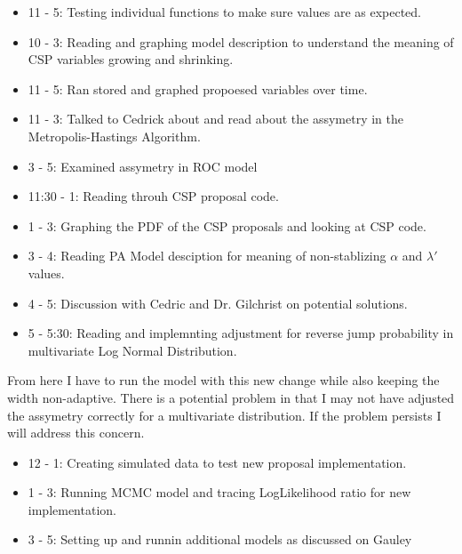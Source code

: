 \documentclass[12pt,hyperref]{labbook}
\begin{document}
\begin{itemize}
    \item 11 - 5: Testing individual functions to make sure values are as expected.
\end{itemize}
\begin{itemize}
    \item 10 - 3: Reading and graphing model description to understand the meaning of CSP variables growing and shrinking.
\end{itemize}
\begin{itemize}
    \item 11 - 5: Ran stored and graphed propoesed variables over time.
\end{itemize}
\begin{itemize}
        \item 11 - 3: Talked to Cedrick about and read about the assymetry in the Metropolis-Hastings Algorithm.
        \item 3 - 5: Examined assymetry in ROC model
\end{itemize}
\begin{itemize}
 \item 11:30 - 1: Reading throuh CSP proposal code.
 \item 1 - 3: Graphing the PDF of the CSP proposals and looking at CSP code.
 \item 3 - 4: Reading PA Model desciption for meaning of non-stablizing $\alpha$ and $\lambda'$ values.
 \item 4 - 5: Discussion with Cedric and Dr. Gilchrist on potential solutions.
 \item 5 - 5:30: Reading and implemnting adjustment for reverse jump probability in multivariate Log Normal Distribution.
\end{itemize}
From here I have to run the model with this new change while also keeping the width non-adaptive. There is a potential problem
in that I may not have adjusted the assymetry correctly for a multivariate distribution. If the problem persists I will address
this concern.
\begin{itemize}
    \item 12 - 1: Creating simulated data to test new proposal implementation.
    \item 1 - 3: Running MCMC model and tracing LogLikelihood ratio for new implementation. 
    \item 3 - 5: Setting up and runnin additional models as discussed on Gauley
\end{itemize}
\end{document}
